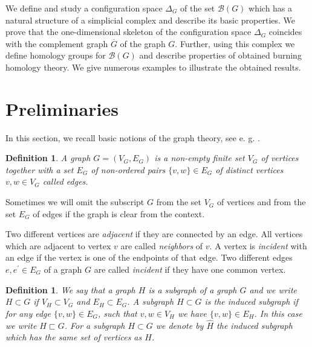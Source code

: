 \documentclass[a4paper, 11pt]{article}
\newtheorem{definition}[theorem]{Definition}
\begin{document}
We define and study a configuration space $\Delta _G$ of  the set $\mathcal B(G)$ which  has a natural structure of a simplicial complex and describe its basic properties.  We prove that the one-dimensional skeleton of the configuration space  $\Delta_G$ coincides with the complement graph $\overline G$ of the graph $G$. Further, using this complex  we define  homology groups  for $\mathcal B(G)$  and describe properties of obtained burning homology theory.  We give numerous examples  to illustrate the obtained results.



\section{Preliminaries}\label{S2}
\setcounter{equation}{0}

In this section, we recall basic notions of  the graph theory, see e. g. 
\cite{Gary, MiHomotopy}.

\begin{definition}\label{d2.1}  \rm
 \emph{A graph} $G=(V_G,E_G)$ is a non-empty finite set $V_G$ of  \emph{vertices} together with a set $E_G$ of non-ordered pairs $\{v,w\}\in E_G$ of distinct vertices $v,w\in V_G$  called \emph{edges}. 
\end{definition}

 Sometimes we will omit 
the subscript $G$ from the set  $V_G$ of vertices and from the set $E_G$ of edges if the graph is clear from the context. 

Two different  vertices are \emph{adjacent} if they are connected by an edge. All vertices which are adjacent to vertex $v$ are called \emph{neighbors} of $v$.  A vertex is \emph{incident} with an edge 
 if the vertex is one of the endpoints of that edge. 
Two different edges $e, e^{\prime}\in E_G$  of a graph $G$ are called \emph{incident} if they have one common vertex.  


\begin{definition}\label{d2.2}\rm  
We say that a  graph  $H$ is a  \emph{subgraph} of a graph $G$  and  we write $H\subset G$ if  $V_H\subset V_G$ and $E_H\subset E_G$. A subgraph 
$H\subset G$ is the \emph{induced subgraph} if for any edge $\{v,w\}\in E_G$,  such that $v, w\in V_H$ we have $\{v,w\}\in E_H$. In this case we write 
$H\sqsubset G$.  For a subgraph $H\subset G$ we denote by $\widehat{H}
$ the induced subgraph which has the same set of vertices as $H$. 
\end{definition}
\end{document}
